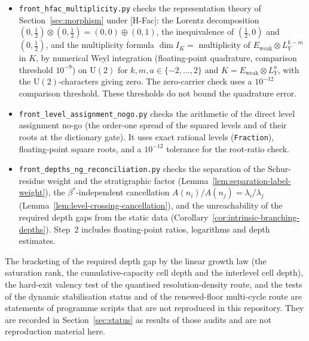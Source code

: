 \documentclass[11pt]{article}
\theoremstyle{definition}
\theoremstyle{remark}
\newcommand{\JPi}{J_{\Pi}}
\newcommand{\Eweak}{E_{\mathrm{weak}}}
\newcommand{\LY}{L_{Y}}
\newcommand{\Opol}{\Omega}
\newcommand{\Aodd}{A_{\Pi}^{\mathrm{odd}}}
\newcommand{\Sym}{\mathrm{Sym}}
\newcommand{\UU}{\mathrm{U}}
\begin{document}
\begin{itemize}
        $g = \exp(2\gamma E)\exp(\gamma F)$, its unique solvability and its eigenbasis formula;
        $\Opol(0) = \mathrm{antiherm}(L(M))$ for symbolic complex $(p, q, r)$, which is $\JPi$-even and non-zero while
        $\Aodd = 0$; the exact real polar factor of
        $g = \exp(tE)\exp(sF)$ and of $\Sym^{2}g$, with the external entry $(t - s)^{2}/((2 + ts)^{2} + (t - s)^{2})$
        ($1/5$ at $(1, 0)$, $1/17$ at $(2, 1)$) and the zero Jarlskog invariant of the real factor; the
        non-identifiability from the square; and the first-order versus finite behaviour of
        Proposition~\ref{prop:polar-nontriviality}.
      \item \texttt{front\_hfac\_multiplicity.py} checks the representation theory of Section~\ref{sec:morphism} under
        [H-Fac]: the Lorentz decomposition $(0, \tfrac12) \otimes (0, \tfrac12) = (0, 0) \oplus (0, 1)$, the
        inequivalence
        of $(\tfrac12, 0)$ and $(0, \tfrac12)$, and the multiplicity formula
        $\dim I_{K} = $ multiplicity of $\Eweak \otimes \LY^{k-m}$ in $K$, by numerical Weyl integration
        (floating-point quadrature, comparison threshold $10^{-9}$) on
        $\UU(2)$ for
        $k, m, a \in \{-2, \dots, 2\}$ and $K = \Eweak \otimes \LY^{a}$, with the $\UU(2)$-characters giving zero.
        The zero-carrier check uses a $10^{-12}$ comparison threshold.
        These thresholds do not bound the quadrature error.
      \item \texttt{front\_level\_assignment\_nogo.py} checks the arithmetic of the direct level assignment no-go
        (the order-one spread of the squared levels and of their roots at the dictionary gate).
        It uses exact rational levels (\texttt{Fraction}), floating-point square roots, and a $10^{-12}$
        tolerance for the root-ratio check.
      \item \texttt{front\_depths\_ng\_reconciliation.py} checks the separation of the Schur-residue weight and the
        stratigraphic factor (Lemma~\ref{lem:separation-label-weight}), the $\beta^{\ast}$-independent cancellation
        $A(n_i)/A(n_j) = \lambda_i/\lambda_j$ (Lemma~\ref{lem:level-crossing-cancellation}), and the unreachability of
        the
        required depth gaps from the static data (Corollary~\ref{cor:intrinsic-branching-depths}).
        Step~2 includes floating-point ratios, logarithms and depth estimates.
    \end{itemize}
    The bracketing of the required depth gap by the linear growth law (the saturation rank, the cumulative-capacity cell
    depth and the interlevel cell depth), the hard-exit valency test of the quantised resolution-density route, and the
    tests of the dynamic stabilisation status and of the renewed-floor multi-cycle route are statements of
    programme scripts that are not reproduced in this repository.
    They are recorded in Section~\ref{sec:status} as results of those audits and are not reproduction material here.

  \newpage

  
  
\end{document}

